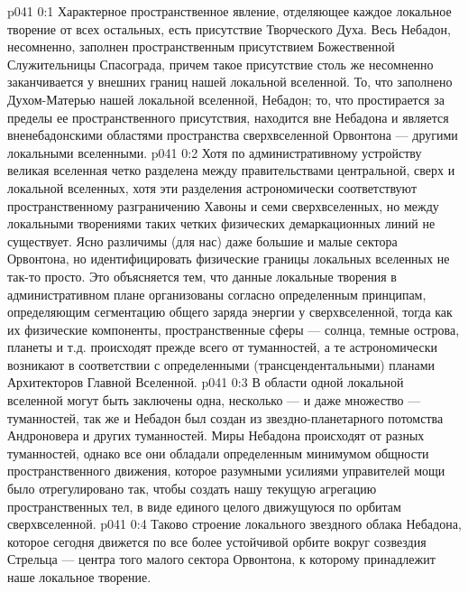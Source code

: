 \author{Архангел}
\vs p041 0:1 Характерное пространственное явление, отделяющее каждое локальное творение от всех остальных, есть присутствие Творческого Духа. Весь Небадон, несомненно, заполнен пространственным присутствием Божественной Служительницы Спасограда, причем такое присутствие столь же несомненно заканчивается у внешних границ нашей локальной вселенной. То, что заполнено Духом\hyp{}Матерью нашей локальной вселенной,  Небадон; то, что простирается за пределы ее пространственного присутствия, находится вне Небадона и является вненебадонскими областями пространства сверхвселенной Орвонтона --- другими локальными вселенными.
\vs p041 0:2 \pc Хотя по административному устройству великая вселенная четко разделена между правительствами центральной, сверх и локальной вселенных, хотя эти разделения астрономически соответствуют пространственному разграничению Хавоны и семи сверхвселенных, но между локальными творениями таких четких физических демаркационных линий не существует. Ясно различимы (для нас) даже большие и малые сектора Орвонтона, но идентифицировать физические границы локальных вселенных не так\hyp{}то просто. Это объясняется тем, что данные локальные творения в административном плане организованы согласно определенным  принципам, определяющим сегментацию общего заряда энергии у сверхвселенной, тогда как их физические компоненты, пространственные сферы --- солнца, темные острова, планеты и т.д. происходят прежде всего от туманностей, а те астрономически возникают в соответствии с определенными  (трансцендентальными) планами Архитекторов Главной Вселенной.
\vs p041 0:3 В области одной локальной вселенной могут быть заключены одна, несколько --- и даже множество --- туманностей, так же и Небадон был создан из звездно\hyp{}планетарного потомства Андроновера и других туманностей. Миры Небадона происходят от разных туманностей, однако все они обладали определенным минимумом общности пространственного движения, которое разумными усилиями управителей мощи было отрегулировано так, чтобы создать нашу текущую агрегацию пространственных тел, в виде единого целого движущуюся по орбитам сверхвселенной.
\vs p041 0:4 Таково строение локального звездного облака Небадона, которое сегодня движется по все более устойчивой орбите вокруг созвездия Стрельца --- центра того малого сектора Орвонтона, к которому принадлежит наше локальное творение.
